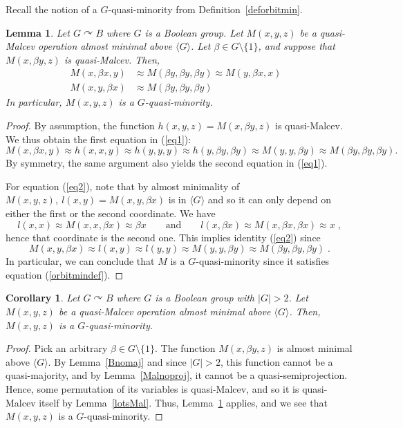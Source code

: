 \documentclass{article}
\newtheorem{corollary}[theorem]{Corollary}
\newtheorem{lemma}[theorem]{Lemma}
\theoremstyle{remark}
\theoremstyle{definition}
\def\acts{\curvearrowright}
\begin{document}
Recall the notion of a $G$-quasi-minority from Definition~\ref{deforbitmin}.

\begin{lemma}\label{orbitmin} 
Let $G\acts B$ where $G$ is a Boolean group. Let $M(x,y,z)$ be a quasi-Malcev operation almost minimal above ${\langle G \rangle}$. Let $\beta\in G\setminus\{1\}$, and suppose that $M(x, \beta y, z)$ is quasi-Malcev. Then,
\begin{align}
    M(x,\beta x, y) & \approx M(\beta y, \beta y, \beta y)\approx M(y,\beta x, x) & \label{eq1}\\
    M(x,y,\beta x)& \approx M(\beta y, \beta y, \beta y) \label{eq2}
\end{align}
In particular, $M(x,y,z)$ is a $G$-quasi-minority.
\end{lemma}
\begin{proof}
By assumption, the function  $h(x,y,z)=M(x,\beta y, z)$ is quasi-Malcev. We thus  obtain the first equation in  (\ref{eq1}):
\[M(x,\beta x, y)\approx h(x,x,y)\approx h(y,y,y)\approx h(y, \beta y, \beta y)\approx M(y,y,\beta y)\approx M(\beta y, \beta y, \beta y).\]
By symmetry, the same argument also yields the second equation in (\ref{eq1}).

For equation (\ref{eq2}), note that by almost minimality of $M(x,y,z), \ l(x,y)=M(x,y,\beta x)$ is in ${\langle G \rangle}$ and so it can only depend on either the first or the second coordinate. We have
\[
l(x,x)\approx M(x,x,\beta x)\approx \beta x\qquad  \text{and} \qquad
l(x,\beta x)\approx M(x,\beta x, \beta x)\approx x\; ,
\]
hence that coordinate is the second one. This implies identity (\ref{eq2}) since 
\[
M(x,y,\beta x)\approx l(x,y)\approx l(y,y)\approx M(y,y,\beta y)\approx M(\beta y, \beta y, \beta y)\; .
\]
In particular, we can conclude that $M$ is a $G$-quasi-minority since it satisfies equation (\ref{orbitmindef}).
\end{proof}

\begin{corollary}\label{cororbitmin} Let $G\acts B$ where $G$ is a Boolean group 
 with $|G|>2$. Let $M(x,y,z)$ be a quasi-Malcev operation almost minimal above ${\langle G \rangle}$. Then, $M(x,y,z)$ is a $G$-quasi-minority.
\end{corollary}
\begin{proof}
Pick an arbitrary $\beta\in G\setminus\{1\}$. The function $M(x,\beta y, z)$ is almost minimal above $\langle G\rangle$. By Lemma~\ref{Bnomaj} and since $|G|>2$, this function cannot be a quasi-majority, and by Lemma~\ref{Malnoproj}, it cannot be a quasi-semiprojection. Hence, some permutation of its variables is quasi-Malcev, and so it is quasi-Malcev itself by Lemma~\ref{lotsMal}. Thus, Lemma~\ref{orbitmin} applies, and we see that $M(x,y,z)$ is a $G$-quasi-minority.
\end{proof}
\end{document}
